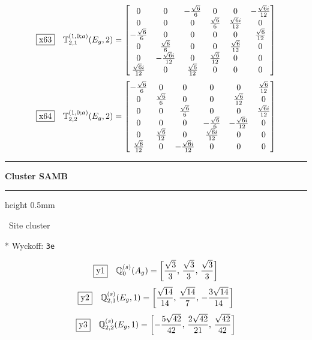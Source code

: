 \documentclass[fleqn,10pt,landscape]{jsarticle}
\begin{document}
\begin{dmath*}
\fbox{x63}\quad \mathbb{T}_{2,1}^{(1,0;a)}(E_{g},2)=\begin{bmatrix} 0 & 0 & - \frac{\sqrt{6}}{6} & 0 & 0 & - \frac{\sqrt{6} i}{12} \\ 0 & 0 & 0 & \frac{\sqrt{6}}{6} & \frac{\sqrt{6} i}{12} & 0 \\ - \frac{\sqrt{6}}{6} & 0 & 0 & 0 & 0 & \frac{\sqrt{6}}{12} \\ 0 & \frac{\sqrt{6}}{6} & 0 & 0 & \frac{\sqrt{6}}{12} & 0 \\ 0 & - \frac{\sqrt{6} i}{12} & 0 & \frac{\sqrt{6}}{12} & 0 & 0 \\ \frac{\sqrt{6} i}{12} & 0 & \frac{\sqrt{6}}{12} & 0 & 0 & 0 \end{bmatrix}
\end{dmath*}
\begin{dmath*}
\fbox{x64}\quad \mathbb{T}_{2,2}^{(1,0;a)}(E_{g},2)=\begin{bmatrix} - \frac{\sqrt{6}}{6} & 0 & 0 & 0 & 0 & \frac{\sqrt{6}}{12} \\ 0 & \frac{\sqrt{6}}{6} & 0 & 0 & \frac{\sqrt{6}}{12} & 0 \\ 0 & 0 & \frac{\sqrt{6}}{6} & 0 & 0 & \frac{\sqrt{6} i}{12} \\ 0 & 0 & 0 & - \frac{\sqrt{6}}{6} & - \frac{\sqrt{6} i}{12} & 0 \\ 0 & \frac{\sqrt{6}}{12} & 0 & \frac{\sqrt{6} i}{12} & 0 & 0 \\ \frac{\sqrt{6}}{12} & 0 & - \frac{\sqrt{6} i}{12} & 0 & 0 & 0 \end{bmatrix}
\end{dmath*}
\vspace{5mm}
\noindent \rule[0.5mm]{5mm}{0.5mm}\hspace{3mm}\textbf{Cluster SAMB}\hspace{3mm}\leaders\hrule height 0.5mm\hfill\kern0pt
\vspace{3mm}

\noindent\textbullet\, Site cluster

\vspace{5mm}

\noindent ** Wyckoff: \texttt{3e}

\begin{dmath*}
\fbox{y1}\quad \mathbb{Q}_{0}^{(s)}(A_{g})=\left[ \frac{\sqrt{3}}{3},\, \frac{\sqrt{3}}{3},\, \frac{\sqrt{3}}{3} \right]
\end{dmath*}
\begin{dmath*}
\fbox{y2}\quad \mathbb{Q}_{2,1}^{(s)}(E_{g},1)=\left[ \frac{\sqrt{14}}{14},\, \frac{\sqrt{14}}{7},\, - \frac{3 \sqrt{14}}{14} \right]
\end{dmath*}
\begin{dmath*}
\fbox{y3}\quad \mathbb{Q}_{2,2}^{(s)}(E_{g},1)=\left[ - \frac{5 \sqrt{42}}{42},\, \frac{2 \sqrt{42}}{21},\, \frac{\sqrt{42}}{42} \right]
\end{dmath*}
\vspace{5mm}
\end{document}
